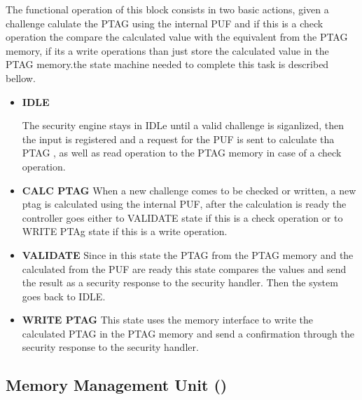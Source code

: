 The functional operation of this block consists in two basic actions, given a challenge
calulate the PTAG  using the internal PUF  and if this is a check operation the compare
 the calculated value with the equivalent from the PTAG memory, if its a write operations
 than just store the calculated value in the PTAG memory.the state machine needed to complete
 this task is described bellow.

\begin{itemize}
  \item{\textbf{IDLE}}
 
The security engine stays in  IDLe  until a valid challenge is siganlized, then the input is 
registered and a request for the PUF is sent to calculate tha PTAG , as well as read operation 
 to the PTAG memory  in case of a check operation.
 
  \item{\textbf{CALC PTAG}}
  When  a new challenge comes to be checked or written, a new ptag is calculated using the internal PUF, 
  after the calculation is ready the controller goes either to VALIDATE state if this is a check operation
  or to WRITE PTAg state if this is a write operation.
  

  \item{\textbf{VALIDATE}}
  Since in this state the PTAG from the PTAG memory and the calculated from the PUF are ready this state compares
  the values and send the result as a security response to the security handler. Then  the system goes back to IDLE.
  

 \item{\textbf{WRITE PTAG}}
 This state  uses the memory interface to  write the calculated PTAG in the PTAG memory and send a confirmation
 through the security response to the security handler.



\end{itemize}






\subsection{Memory Management Unit (\pmmu)}
\label{subsec:pmmu}
\lorenipsuns

\subsection{\ptagmem}
\label{subsec:ptagmem}
\lorenipsuns



